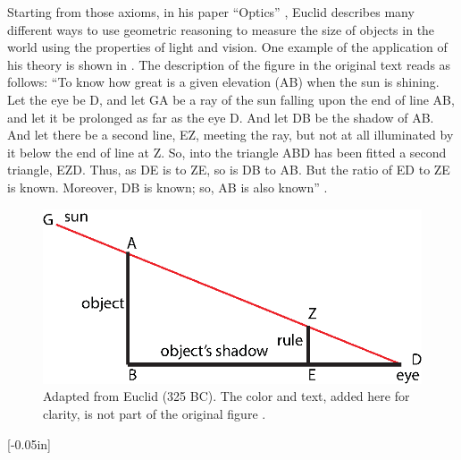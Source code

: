 Starting from those axioms, in his paper ``Optics'' \cite{Burton1945}, Euclid describes many different ways to use geometric reasoning to measure the size of objects in the world using the properties of light and vision.  
One example of the application of his theory is shown in \fig{\ref{fig:euclid}}.
The description of the figure in the original text reads as follows: 
``To know how great is a given elevation (AB) when the sun is shining. Let the eye be D, and let GA be a ray of the sun falling upon the end of line AB, and let it be prolonged as far as the eye D. And let DB be the shadow of AB. And let there be a second line, EZ, meeting the ray, but not at all illuminated by it below the end of line at Z. So, into the triangle ABD has been fitted a second triangle, EZD. Thus, as DE is to ZE, so is DB to AB. But the ratio of ED to ZE is known. Moreover, DB is known; so, AB is also known''
\cite{Burton1945}.


\begin{figure}[t]
\centerline{
\includegraphics[width=0.6\linewidth]{figures/taxonomy/euclid.eps}
} 
\caption{Adapted from Euclid (325 BC). The color and text, added here for clarity, is not part of the original figure \cite{Burton1945}. 
} 
\label{fig:euclid}
\end{figure}


[-0.05in]


